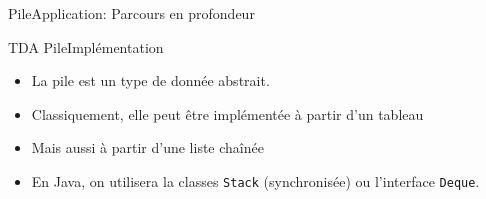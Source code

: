 \documentclass[12pt,a4paper]{beamer}
\begin{document}
\begin{frame}{Pile}{Application: \textcolor{blueemph}{Parcours en profondeur}}
{\begin{figure}
\end{figure}
}

\end{frame}

\begin{frame}{TDA Pile}{Implémentation}

\begin{itemize}
\item La pile est un type de donnée abstrait. 
\item Classiquement, elle peut être implémentée à partir d'un tableau
\item Mais aussi à partir d'une liste chaînée 
\item En \textcolor{blueemph}{Java}, on utilisera la classes \texttt{Stack} (synchronisée) ou l'interface \texttt{Deque}. 
\end{itemize}
\end{frame}
\end{document}
